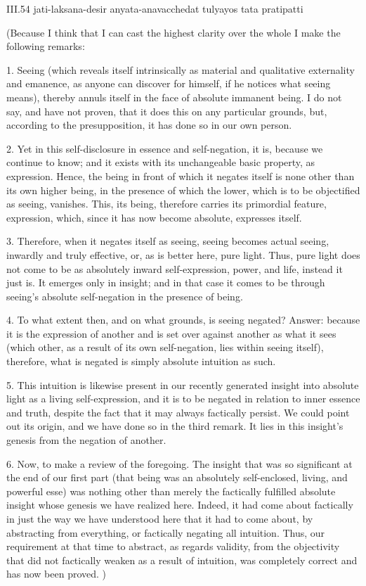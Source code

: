 III.54
jati-laksana-desir anyata-anavacchedat tulyayos tata pratipatti

(Because I think that I can cast
the highest clarity over the whole
I make the following remarks:

1. Seeing
(which reveals itself intrinsically
as material and qualitative externality and emanence,
as anyone can discover for himself,
if he notices what seeing means),
thereby annuls itself in the face
of absolute immanent being.
I do not say, and have not proven,
that it does this on any particular grounds,
but, according to the presupposition,
it has done so in our own person.

2.  Yet in this self-disclosure
in essence and self-negation,
it is, because we continue to know;
and it exists with its unchangeable basic property,
as expression.
Hence, the being in front of which
it negates itself is none other
than its own higher being,
in the presence of which the lower,
which is to be objectified as seeing, vanishes.
This, its being, therefore carries its
primordial feature, expression,
which, since it has now become absolute,
expresses itself.

3. Therefore, when it negates itself as seeing,
seeing becomes actual seeing,
inwardly and truly effective,
or, as is better here, pure light.
Thus, pure light does not come to be as
absolutely inward self-expression, power, and life,
instead it just is.
It emerges only in insight;
and in that case it comes to be
through seeing's absolute self-negation
in the presence of being.

4. To what extent then,
and on what grounds,
is seeing negated?
Answer: because it is the expression of another
and is set over against another as what it sees
(which other, as a result of its own self-negation,
lies within seeing itself),
therefore, what is negated
is simply absolute intuition as such.

5. This intuition is likewise present
in our recently generated insight into
absolute light as a living self-expression,
and it is to be negated in relation to
inner essence and truth,
despite the fact that it may
always factically persist.
We could point out its origin,
and we have done so in the third remark.
It lies in this insight's genesis
from the negation of another.

6. Now, to make a review of the foregoing.
The insight that was so significant
at the end of our first part
(that being was an absolutely
self-enclosed, living, and powerful esse)
was nothing other than merely
the factically fulfilled absolute insight
whose genesis we have realized here.
Indeed, it had come about factically
in just the way we have understood
here that it had to come about,
by abstracting from everything,
or factically negating all intuition.
Thus, our requirement at that time to abstract,
as regards validity, from the objectivity
that did not factically weaken as a result of intuition,
was completely correct and has now been proved.
)

